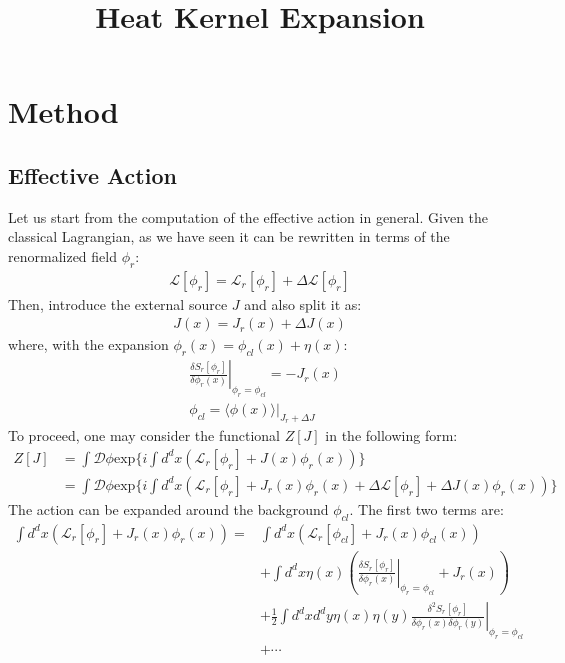 \documentclass[fleqn]{article}
\title{Heat Kernel Expansion}
\begin{document}
\maketitle
\section{Method}
\subsection{Effective Action}
Let us start from the computation of the effective action in general. Given the classical Lagrangian, as we have seen it can be rewritten in terms of the renormalized field $\phi _r$:
\begin{align}
\mathcal{L} [\phi_r] = \mathcal{L}_r[\phi_r] + \Delta \mathcal{L}[\phi_r]
\end{align}
Then, introduce the external source $J$ and also split it as:
\begin{align}
J(x) = J_r(x) + \Delta J(x)
\end{align}
where, with the expansion $\phi_r(x) = \phi_{cl} (x) + \eta (x)$: 
\begin{align}
&\left. \frac{\delta S_r [\phi _r]}{\delta \phi _r (x)} \right| _{\phi_r = \phi_{cl}} = -J_r(x) \\
&\phi_{cl} = \left. \langle \phi(x) \rangle \right|_{J_r + \Delta J} 
\end{align}
To proceed, one may consider the functional $Z[J]$ in the following form:
\begin{align}
Z[J] &= \int \mathcal{D}\phi \text{exp}\lbrace i\int d^{d}x (\mathcal{L}_{r} [\phi_r] + J(x) \phi_{r}(x)) \rbrace \nonumber \\
&= \int \mathcal{D} \phi \text{exp} \lbrace i\int d^{d}x (\mathcal{L}_r[\phi_r]  + J_{r}(x)\phi_{r}(x) + \Delta \mathcal{L}[\phi_r] + \Delta J(x) \phi_{r}(x)) \rbrace
\end{align}
The action can be expanded around the background $\phi_{cl}$. The first two terms are:
\begin{align}
\int d^{d}x (\mathcal{L}_r[\phi_r]  + J_{r}(x)\phi_{r}(x))  = &\int d^{d}x (\mathcal{L}_r[\phi_{cl}]  + J_{r}(x)\phi_{cl}(x)) \nonumber \\ 
&+ \int d^{d}x \eta(x) (\left.\frac{\delta S_{r}[\phi_{r}]}{\delta \phi_{r}(x)} \right|_{\phi_{r} = \phi_{cl}} + J_{r}(x) ) \nonumber  \\
& + \frac{1}{2} \int d^{d}x d^{d}y \eta (x)\eta (y) \left. \frac{\delta^{2} S_{r}[\phi_{r}]}{\delta \phi_{r}(x) \delta \phi_{r} (y)} \right|_{\phi_{r} = \phi_{cl}} \nonumber \\
&+ \cdots
\end{align}
\end{document}

